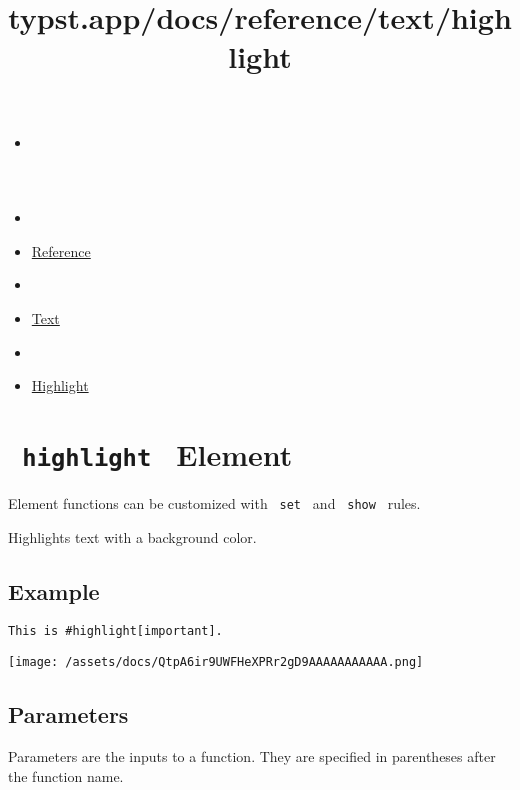 \title{typst.app/docs/reference/text/highlight}

\begin{itemize}
\tightlist
\item
  \href{/docs}{}
\item
  
\item
  \href{/docs/reference/}{Reference}
\item
  
\item
  \href{/docs/reference/text/}{Text}
\item
  
\item
  \href{/docs/reference/text/highlight/}{Highlight}
\end{itemize}

\section{\texorpdfstring{\texttt{\ highlight\ } {{ Element
}}}{ highlight   Element }}\label{summary}

\label{element-tooltip}
Element functions can be customized with \texttt{\ set\ } and
\texttt{\ show\ } rules.

Highlights text with a background color.

\subsection{Example}\label{example}

\begin{verbatim}
This is #highlight[important].
\end{verbatim}

\texttt{[image: /assets/docs/QtpA6ir9UWFHeXPRr2gD9AAAAAAAAAAA.png]}

\subsection{\texorpdfstring{{ Parameters
}}{ Parameters }}\label{parameters}

\label{parameters-tooltip}
Parameters are the inputs to a function. They are specified in
parentheses after the function name.

